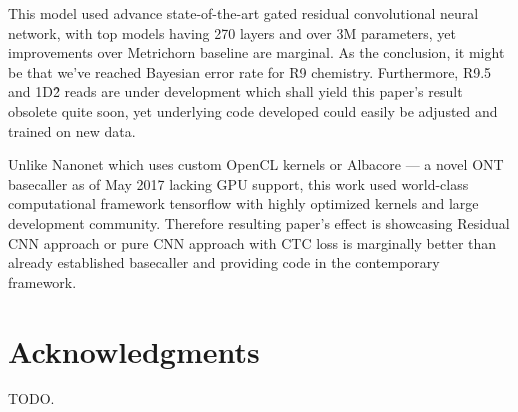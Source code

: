 \documentclass[times, utf8, seminar, numeric]{fer}
\begin{document}
This model used advance state-of-the-art gated residual convolutional neural network, with top models having 270 layers and over 3M parameters, yet improvements over Metrichorn baseline are marginal. As the conclusion, it might be that we've reached Bayesian error rate for R9 chemistry. Furthermore, R9.5 and 1D\^2 reads are under development which shall yield this paper's result obsolete quite soon, yet underlying code developed could easily be adjusted and trained on new data.

Unlike Nanonet which uses custom OpenCL kernels or Albacore --- a novel ONT basecaller as of May 2017 lacking GPU support, this work used world-class computational framework tensorflow with highly optimized kernels and large development community. Therefore resulting paper's effect is showcasing Residual CNN approach or pure CNN approach with CTC loss is marginally better than already established basecaller and providing code in the contemporary framework.

\chapter{Acknowledgments}

TODO.



\end{document}
